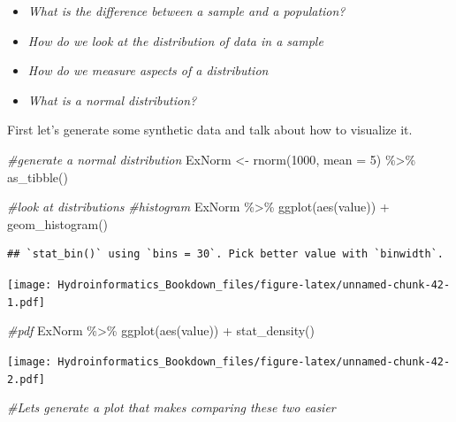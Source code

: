 \documentclass[
]{book}
\newenvironment{Shaded}{\begin{snugshade}}{\end{snugshade}}
\newcommand{\AttributeTok}[1]{\textcolor[rgb]{0.77,0.63,0.00}{#1}}
\newcommand{\CommentTok}[1]{\textcolor[rgb]{0.56,0.35,0.01}{\textit{#1}}}
\newcommand{\DecValTok}[1]{\textcolor[rgb]{0.00,0.00,0.81}{#1}}
\newcommand{\FunctionTok}[1]{\textcolor[rgb]{0.00,0.00,0.00}{#1}}
\newcommand{\NormalTok}[1]{#1}
\newcommand{\OtherTok}[1]{\textcolor[rgb]{0.56,0.35,0.01}{#1}}
\newcommand{\SpecialCharTok}[1]{\textcolor[rgb]{0.00,0.00,0.00}{#1}}
\providecommand{\tightlist}{%
  \setlength{\itemsep}{0pt}\setlength{\parskip}{0pt}}
\begin{document}
\begin{itemize}
\tightlist
\item
  \emph{What is the difference between a sample and a population?}
\item
  \emph{How do we look at the distribution of data in a sample}
\item
  \emph{How do we measure aspects of a distribution}
\item
  \emph{What is a normal distribution?}
\end{itemize}

First let's generate some synthetic data and talk about how to visualize it.

\begin{Shaded}
\begin{Highlighting}[]
\CommentTok{\#generate a normal distribution}
\NormalTok{ExNorm }\OtherTok{\textless{}{-}} \FunctionTok{rnorm}\NormalTok{(}\DecValTok{1000}\NormalTok{, }\AttributeTok{mean =} \DecValTok{5}\NormalTok{) }\SpecialCharTok{\%\textgreater{}\%} 
  \FunctionTok{as\_tibble}\NormalTok{()}

\CommentTok{\#look at distributions}
\CommentTok{\#histogram}
\NormalTok{ExNorm }\SpecialCharTok{\%\textgreater{}\%}
  \FunctionTok{ggplot}\NormalTok{(}\FunctionTok{aes}\NormalTok{(value)) }\SpecialCharTok{+}
  \FunctionTok{geom\_histogram}\NormalTok{()}
\end{Highlighting}
\end{Shaded}

\begin{verbatim}
## `stat_bin()` using `bins = 30`. Pick better value with `binwidth`.
\end{verbatim}

\texttt{[image: Hydroinformatics\_Bookdown\_files/figure-latex/unnamed-chunk-42-1.pdf]}

\begin{Shaded}
\begin{Highlighting}[]
\CommentTok{\#pdf}
\NormalTok{ExNorm }\SpecialCharTok{\%\textgreater{}\%}
  \FunctionTok{ggplot}\NormalTok{(}\FunctionTok{aes}\NormalTok{(value)) }\SpecialCharTok{+}
  \FunctionTok{stat\_density}\NormalTok{()}
\end{Highlighting}
\end{Shaded}

\texttt{[image: Hydroinformatics\_Bookdown\_files/figure-latex/unnamed-chunk-42-2.pdf]}

\begin{Shaded}
\begin{Highlighting}[]
\CommentTok{\#Let\textquotesingle{}s generate a plot that makes comparing these two easier}
\end{Highlighting}
\end{Shaded}
\end{document}
